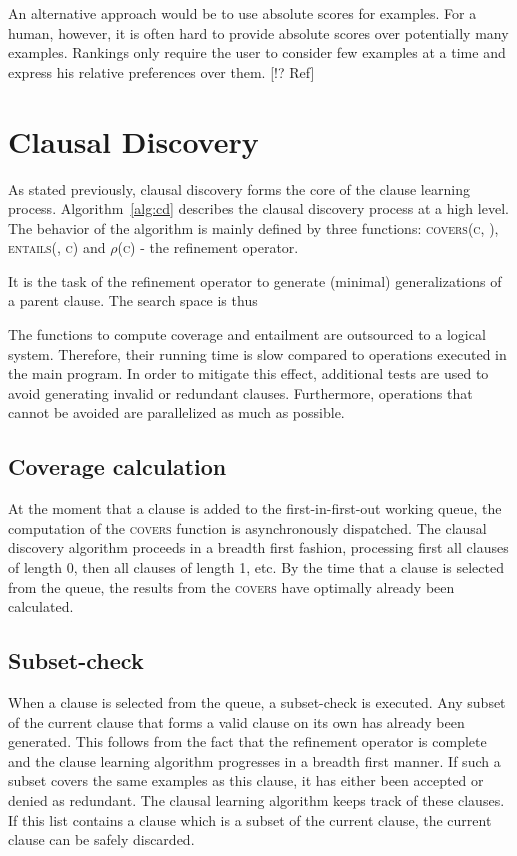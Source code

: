 An alternative approach would be to use absolute scores for examples.
For a human, however, it is often hard to provide absolute scores over potentially many examples.
Rankings only require the user to consider few examples at a time and express his relative preferences over them.
[!? Ref]

\section{Clausal Discovery}
As stated previously, clausal discovery forms the core of the clause learning process.
Algorithm~\ref{alg:cd} describes the clausal discovery process at a high level.
The behavior of the algorithm is mainly defined by three functions: \textsc{covers(c, )}, \textsc{entails(, c)} and \textsc{$\rho$(c)} - the refinement operator.


It is the task of the refinement operator to generate (minimal) generalizations of a parent clause.
The search space is thus 

The functions to compute coverage and entailment are outsourced to a logical system.
Therefore, their running time is slow compared to operations executed in the main program.
In order to mitigate this effect, additional tests are used to avoid generating invalid or redundant clauses.
Furthermore, operations that cannot be avoided are parallelized as much as possible.

\subsection{Coverage calculation}
At the moment that a clause is added to the first-in-first-out working queue, the computation of the \textsc{covers} function is asynchronously dispatched.
The clausal discovery algorithm proceeds in a breadth first fashion, processing first all clauses of length 0, then all clauses of length 1, etc.
By the time that a clause is selected from the queue, the results from the \textsc{covers} have optimally already been calculated.

\subsection{Subset-check}
When a clause is selected from the queue, a subset-check is executed.
Any subset of the current clause that forms a valid clause on its own has already been generated.
This follows from the fact that the refinement operator is complete and the clause learning algorithm progresses in a breadth first manner.
If such a subset covers the same examples as this clause, it has either been accepted or denied as redundant.
The clausal learning algorithm keeps track of these clauses.
If this list contains a clause which is a subset of the current clause, the current clause can be safely discarded.


